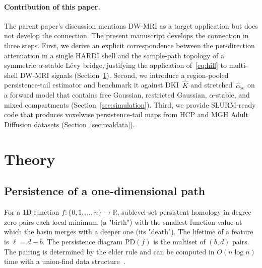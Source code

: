 \documentclass[11pt,letterpaper]{article}
\newcommand{\R}{\mathbb{R}}
\newcommand{\stab}{\alpha}
\newcommand{\PD}{\mathrm{PD}}
\newcommand{\life}{\ell}
\newcommand{\birth}{b}
\newcommand{\death}{d}
\begin{document}
\paragraph*{Contribution of this paper.}
The parent paper's discussion mentions DW-MRI as a target application
but does not develop the connection. The present manuscript develops
the connection in three steps. First, we derive an explicit
correspondence between the per-direction attenuation in a single
HARDI shell and the sample-path topology of a symmetric $\stab$-stable
L\'evy bridge, justifying the application of~\eqref{eq:hill} to
multi-shell DW-MRI signals
(Section~\ref{sec:theory}). Second, we introduce a region-pooled
persistence-tail estimator and benchmark it against DKI~$\widehat{K}$
and stretched~$\widehat{\stab}_{\mathrm{se}}$ on a forward model that
contains free Gaussian, restricted Gaussian, $\stab$-stable, and mixed
compartments (Section~\ref{sec:simulation}). Third, we provide
SLURM-ready code that produces voxelwise persistence-tail maps from
HCP and MGH Adult Diffusion datasets (Section~\ref{sec:realdata}).

\section{Theory}\label{sec:theory}

\subsection{Persistence of a one-dimensional path}
For a 1D function $f:\{0,1,\dots,n\}\to\R$, sublevel-set persistent
homology in degree zero pairs each local minimum (a "birth") with the
smallest function value at which the basin merges with a deeper one
(its "death"). The lifetime of a feature is
$\life = \death - \birth$. The persistence diagram $\PD(f)$ is the
multiset of $(\birth,\death)$ pairs. The pairing is determined by the
elder rule and can be computed in $O(n\log n)$ time with a union-find
data structure~\citep{edelsbrunner2010computational}.
\end{document}
